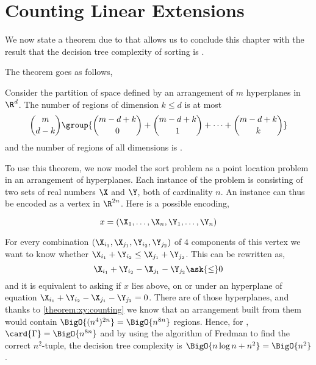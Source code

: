 \section{Counting Linear Extensions}
\label{tree:xy:counting}

We now state a theorem due to \citet*{buck:1943} that allows us to conclude
this chapter with the result that the decision tree complexity of sorting \XY
is .

The theorem goes as follows,

\begin{theorem}\label{theorem:xy:counting}
Consider the partition of space defined by an arrangement of $m$ hyperplanes in
$\R^d$.
The number of regions of dimension $k \le d$ is at most
\begin{displaymath}
\binom{m}{d-k} \group{ \binom{m-d+k}{0} + \binom{m-d+k}{1} + \cdots + \binom{m-d+k}{k} }
\end{displaymath}
and the number of regions of all dimensions is .
\end{theorem}

To use this theorem, we now model the sort \XY problem as a point location problem in an
arrangement of hyperplanes. Each instance of the problem is consisting of two
sets of real numbers $\X$ and $\Y$, both of cardinality $n$. An instance can
thus be encoded as a vertex in $\R^{2n}$. Here is a possible encoding,

$$x = (\X_1, \ldots, \X_n, \Y_1, \ldots, \Y_n)$$

For every combination $(\X_{i_1}, \X_{j_1}, \Y_{i_2}, \Y_{j_2})$ of $4$
components of this vertex we want to know whether $\X_{i_1} + \Y_{i_2} \le
\X_{j_1} + \Y_{j_2}$. This can be rewritten as,
$$\X_{i_1} + \Y_{i_2} - \X_{j_1} - \Y_{j_2} \ask{\le} 0$$
and it is equivalent to asking if $x$ lies above, on or under an
hyperplane of equation $\X_{i_1} + \Y_{i_2} - \X_{j_1} - \Y_{j_2} = 0$. There
are  of those hyperplanes, and thanks to \ref{theorem:xy:counting}
we know that an arrangement built from them would contain
$\BigO{(n^4)^{2n}} = \BigO{n^{8n}}$ regions. Hence, for \XY, $\card{\Gamma} =
\BigO{n^{8n}}$ and by using the algorithm of Fredman to find the correct
$n^2$-tuple, the decision tree complexity is
$\BigO{n \log n + n^2} = \BigO{n^2}$.
